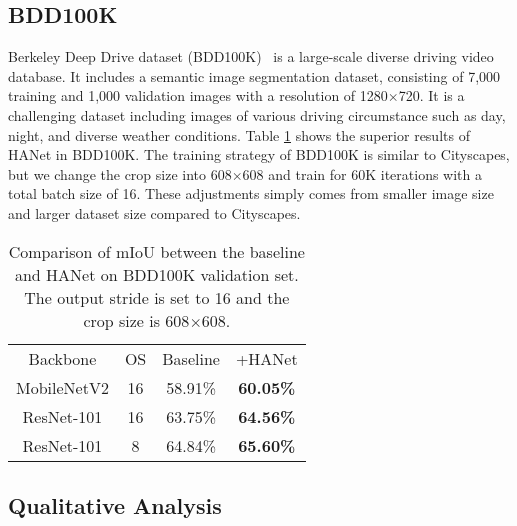 \documentclass[10pt,twocolumn,letterpaper]{article}
\newcommand{\drule}{\specialrule{0.2pt}{1pt}{1pt}\specialrule{0.2pt}{0pt}{\belowrulesep}}
\begin{document}
\vspace*{-0.1cm}
\subsection{BDD100K}\vspace*{-0.1cm}
Berkeley Deep Drive dataset (BDD100K)~\cite{yu2018bdd100k} is a large-scale diverse driving video database. It includes a semantic image segmentation dataset, consisting of 7,000 training and 1,000 validation images with a resolution of 1280$\times$720. 
It is a challenging dataset including images of various driving circumstance such as day, night, and diverse weather conditions.
Table \ref{tab_bdd100k} shows the superior results of HANet in BDD100K. 
The training strategy of BDD100K is similar to Cityscapes, but we change the crop size into 608$\times$608 and train for 60K iterations with a total batch size of 16. 
These adjustments simply comes from smaller image size and larger dataset size compared to Cityscapes.

\setcounter{table}{6}
\begin{table}[h!]
\begin{center}
\footnotesize
\begin{tabular}{c|c|c|c}
\toprule
Backbone & OS & Baseline & +HANet \\
\drule
MobileNetV2 & 16 & 58.91\% & \textbf{60.05\%} \\
\midrule
ResNet-101 & 16 & 63.75\% & \textbf{64.56\%} \\
\midrule
ResNet-101 & 8 & 64.84\% & \textbf{65.60\%} \\
\bottomrule
\end{tabular}
\end{center}
\vspace*{-0.5cm}
\caption{Comparison of mIoU between the baseline and HANet on BDD100K validation set. The output stride is set to 16 and the crop size is 608$\times$608.}
\label{tab_bdd100k}
\vspace{-0.4cm}
\end{table}








\vspace*{-0.1cm}
\subsection{Qualitative Analysis} \label{sec:vis}
\vspace*{-0.1cm}
\end{document}
